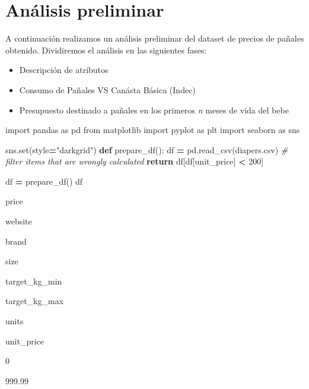 \documentclass[
]{article}
\author{}
\date{\vspace{-2.5em}}
\newenvironment{Shaded}{\begin{snugshade}}{\end{snugshade}}
\newcommand{\BuiltInTok}[1]{#1}
\newcommand{\CommentTok}[1]{\textcolor[rgb]{0.56,0.35,0.01}{\textit{#1}}}
\newcommand{\ControlFlowTok}[1]{\textcolor[rgb]{0.13,0.29,0.53}{\textbf{#1}}}
\newcommand{\DecValTok}[1]{\textcolor[rgb]{0.00,0.00,0.81}{#1}}
\newcommand{\ImportTok}[1]{#1}
\newcommand{\KeywordTok}[1]{\textcolor[rgb]{0.13,0.29,0.53}{\textbf{#1}}}
\newcommand{\NormalTok}[1]{#1}
\newcommand{\OperatorTok}[1]{\textcolor[rgb]{0.81,0.36,0.00}{\textbf{#1}}}
\newcommand{\StringTok}[1]{\textcolor[rgb]{0.31,0.60,0.02}{#1}}
\providecommand{\tightlist}{%
  \setlength{\itemsep}{0pt}\setlength{\parskip}{0pt}}
\begin{document}
\hypertarget{anuxe1lisis-preliminar}{%
\section{Análisis preliminar}\label{anuxe1lisis-preliminar}}

A continuación realizamos un análisis preliminar del dataset de precios
de pañales obtenido. Dividiremos el análisis en las siguientes fases:

\begin{itemize}
\tightlist
\item
  Descripción de atributos
\item
  Consumo de Pañales VS Canásta Básica (Indec)
\item
  Presupuesto destinado a pañales en los primeros \emph{n} meses de vida
  del bebe
\end{itemize}

\begin{Shaded}
\begin{Highlighting}[]
\ImportTok{import}\NormalTok{ pandas }\ImportTok{as}\NormalTok{ pd}
\ImportTok{from}\NormalTok{ matplotlib }\ImportTok{import}\NormalTok{ pyplot }\ImportTok{as}\NormalTok{ plt}
\ImportTok{import}\NormalTok{ seaborn }\ImportTok{as}\NormalTok{ sns}

\NormalTok{sns.}\BuiltInTok{set}\NormalTok{(style}\OperatorTok{=}\StringTok{"darkgrid"}\NormalTok{)}
\KeywordTok{def}\NormalTok{ prepare\_df():}
\NormalTok{    df }\OperatorTok{=}\NormalTok{ pd.read\_csv(}\StringTok{\textquotesingle{}diapers.csv\textquotesingle{}}\NormalTok{)}
    \CommentTok{\# filter items that are wrongly calculated}
    \ControlFlowTok{return}\NormalTok{ df[df[}\StringTok{\textquotesingle{}unit\_price\textquotesingle{}}\NormalTok{] }\OperatorTok{\textless{}} \DecValTok{200}\NormalTok{]}

\NormalTok{df }\OperatorTok{=}\NormalTok{ prepare\_df()}
\NormalTok{df}
\end{Highlighting}
\end{Shaded}

price

website

brand

size

target\_kg\_min

target\_kg\_max

units

unit\_price

0

999.99
\end{document}
